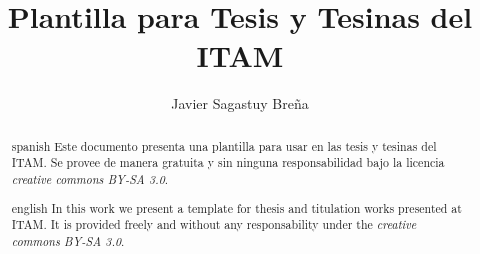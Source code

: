 \documentclass{tesisITAM}
\title{Plantilla para Tesis y Tesinas del ITAM}
\author{Javier Sagastuy Breña}
\begin{document}
  \maketitle
  \publicationrights


  \begin{abstract}{spanish}
    Este documento presenta una plantilla para usar en las tesis y tesinas del ITAM. Se provee de manera gratuita y sin ninguna responsabilidad bajo la licencia \emph{creative commons BY-SA 3.0}.
  \end{abstract}

  \begin{abstract}{english}
    In this work we present a template for thesis and titulation works presented at ITAM. It is provided freely and without any responsability under the \emph{creative commons BY-SA 3.0}. 
  \end{abstract}


  \setcounter{page}{1}

  \tableofcontents
  \listoffigures
  \listoftables
  \newpage

  \setcounter{page}{1}


  





  \appendix

  \clearpage
  
\end{document}
